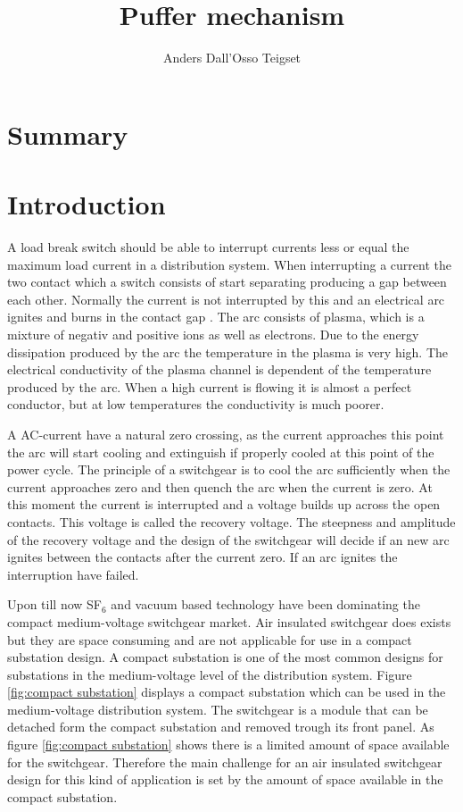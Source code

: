 \documentclass[10pt,a4paper]{article}
\author{Anders Dall'Osso Teigset}
\title{Puffer mechanism}
\begin{document}
\maketitle
\section{Summary}
\tableofcontents
\newpage
\section{Introduction}
A load break switch should be able to interrupt currents less or equal the maximum load current in a distribution system. When interrupting a current the two contact which a switch consists of start separating producing a gap between each other. Normally the current is not interrupted by this and an electrical arc ignites and burns in the contact gap \cite{bib:HVEbreak}. The arc consists of plasma, which is a mixture of negativ and positive ions as well as electrons. Due to the energy dissipation produced by the arc the temperature in the plasma is very high. The electrical conductivity of the plasma channel is dependent of the temperature produced by the arc. When a high current is flowing it is almost a perfect conductor, but at low temperatures the conductivity is much poorer.

A AC-current have a natural zero crossing, as the current approaches this point the arc will start cooling and extinguish if properly cooled at this point of the power cycle. The principle of a switchgear is to cool the arc sufficiently when the current approaches zero and then quench the arc when the current is zero. At this moment the current is interrupted and a voltage builds up across the open contacts. This voltage is called the recovery voltage. The steepness and amplitude of the recovery voltage \cite{bib:HVEbreak} and the design of the switchgear will decide if an new arc ignites between the contacts after the current zero. If an arc ignites the interruption have failed.

Upon till now SF$_6$ and vacuum based technology have been dominating the compact medium-voltage switchgear market. Air insulated switchgear does exists but they are space consuming and are not applicable for use in a compact substation design. A compact substation is one of the most common designs for substations in the medium-voltage level of the distribution system. Figure \ref{fig:compact substation} displays a compact substation which can be used in the medium-voltage distribution system. The switchgear is a module that can be detached form the compact substation and removed trough its front panel. As figure \ref{fig:compact substation} shows there is a limited amount of space available for the switchgear. Therefore the main challenge for an air insulated switchgear design for this kind of application is set by the amount of space available in the compact substation.
\end{document}

